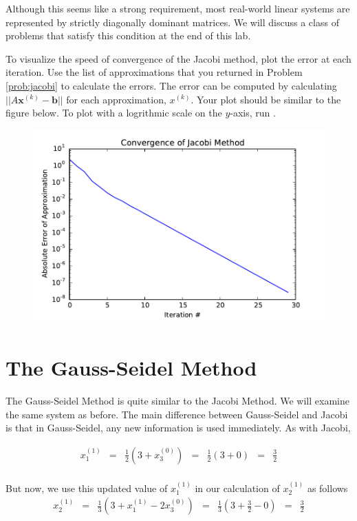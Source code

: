 Although this seems like a strong requirement, most real-world linear systems
are represented by strictly diagonally dominant matrices.
We will discuss a class of problems that satisfy this condition at the end of
this lab.

\begin{problem}
To visualize the speed of convergence of the Jacobi method, plot the error at each
iteration. Use the list of approximations that you returned in Problem \ref{prob:jacobi}
to calculate the errors. The error can be computed by calculating
$||A\mathbf{x}^{(k)} - \mathbf{b}||$
for each approximation, $x^{(k)}$. Your plot should be similar to the figure below.
To plot with a logrithmic scale on the $y$-axis, run .
\end{problem}

\begin{figure} \label{fig:jacobi_convergence}
\includegraphics[width=.7\textwidth]{jacobi_convergence.pdf}
\label{fig:jacobi_convergence}
\end{figure}

\section*{The Gauss-Seidel Method} %

The Gauss-Seidel Method is quite similar to the Jacobi Method. We will examine
the same system as before. The main difference between Gauss-Seidel and Jacobi
is that in Gauss-Seidel, any new information is used immediately. As with Jacobi,

$$
\begin{matrix}
x^{(1)}_1 & = & \frac{1}{2} ( 3 + x^{(0)}_3)  & = & \frac{1}{2} (3 + 0)     & = & \frac{3}{2} \\
\end{matrix}
$$

But now, we use this updated value of $x^{(1)}_1$ in our calculation of
$x^{(1)}_2$ as follows
$$
\begin{matrix}
x^{(1)}_2 & = & \frac{1}{3} ( 3 + x^{(1)}_1 - 2x^{(0)}_3) & = & \frac{1}{3} (3 + \frac{3}{2} - 0) & = & \frac{3}{2} \\
\end{matrix}
$$

